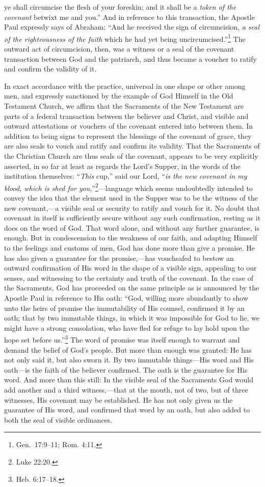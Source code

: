 \documentclass[
  english,
]{book}
\begin{document}
ye shall circumcise the flesh of your foreskin; and it shall be a \emph{token of the covenant} betwixt me and you.'' And in reference to this transaction, the Apostle Paul expressly says of Abraham: ``And he received the sign of circumcision, \emph{a seal of the righteousness of the faith} which he had yet being uncircumcised.''\footnote{Gen.~17:9--11; Rom. 4:11.} The outward act of circumcision, then, was a witness or a seal of the covenant transaction between God and the patriarch, and thus became a voucher to ratify and confirm the validity of it.

In exact accordance with the practice, universal in one shape or other among men, and expressly sanctioned by the example of God Himself in the Old Testament Church, we affirm that the Sacraments of the New Testament are parts of a federal transaction between the believer and Christ, and visible and outward attestations or vouchers of the covenant entered into between them. In addition to being signs to represent the blessings of the covenant of grace, they are also seals to vouch and ratify and confirm its validity. That the Sacraments of the Christian Church are thus seals of the covenant, appears to be very explicitly asserted, in so far at least as regards the Lord's Supper, in the words of the institution themselves: ``\emph{This} cup,'' said our Lord, ``\emph{is the new covenant in my blood, which is shed for you},''\footnote{Luke 22:20.}---language which seems undoubtedly intended to convey the idea that the element used in the Supper was to be the witness of the new covenant,---a visible seal or security to ratify and vouch for it. No doubt that covenant in itself is sufficiently secure without any such confirmation, resting as it does on the word of God. That word alone, and without any further guarantee, is enough. But in condescension to the weakness of our faith, and adapting Himself to the feelings and customs of men, God has done more than give a promise. He has also given a guarantee for the promise,---has vouchsafed to bestow an outward confirmation of His word in the shape of a visible sign, appealing to our senses, and witnessing to the certainty and truth of the covenant. In the case of the Sacraments, God has proceeded on the same principle as is announced by the Apostle Paul in reference to His oath: ``God, willing more abundantly to show unto the heirs of promise the immutability of His counsel, confirmed it by an oath; that by two immutable things, in which it was impossible for God to lie, we might have a strong consolation, who have fled for refuge to lay hold upon the hope set before us.''\footnote{Heb. 6:17--18.} The word of promise was itself enough to warrant and demand the belief of God's people. But more than enough was granted: He has not only said it, but also sworn it. By two immutable things---His word and His oath---is the faith of the believer confirmed. The oath is the guarantee for His word. And more than this still: In the visible seal of the Sacraments God would add another and a third witness,---that at the mouth, not of two, but of three witnesses, His covenant may be established. He has not only given us the guarantee of His word, and confirmed that word by an oath, but also added to both the seal of visible ordinances. 
\end{document}
